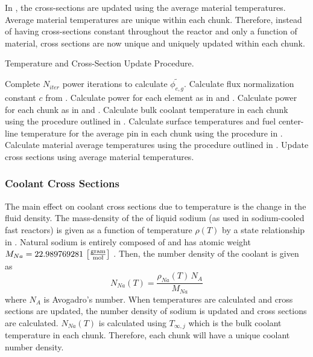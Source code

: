     In , the cross-sections are
    updated using the average material temperatures. Average material
    temperatures are unique within each chunk. Therefore, instead of having
    cross-sections constant throughout the reactor and only a function of
    material, cross sections are now unique and uniquely updated within each
    chunk.

    \begin{algorithm}
      \caption{Temperature and Cross-Section Update Procedure.}
      \label{algorithm:temperature_update}
      \begin{algorithmic}[1]
        \State Complete $N_{iter}$ power iterations to calculate
          $\widetilde{\phi_{e,g}}$.
        \State Calculate flux normalization constant $c$ from
          .
        \State Calculate power for each element as in  and
          .
        \State Calculate power for each chunk as in  and
          .
        \State Calculate bulk coolant temperature in each chunk using the 
          procedure outlined in .
        \State Calculate surface temperatures and fuel center-line temperature
          for the average pin in each chunk using the procedure in 
          .
        \State Calculate material average temperatures using the procedure 
          outlined in .
        \State Update cross sections using average material temperatures.
      \end{algorithmic}
    \end{algorithm}

    \subsubsection{Coolant Cross Sections}
      The main effect on coolant cross sections due to temperature is the change
      in the fluid density. The mass-density of the of liquid sodium (as used in
      sodium-cooled fast reactors) is given as a function of temperature
      $\rho(T)$ by a state relationship in \cite{sodiumProp}. Natural sodium is
      entirely composed of  and has atomic weight $M_{Na} =
      22.989769281 \,\left[\text{{$\frac{\text{gram}}{\text{mol}}$}}\right]$ \cite{nuclides}.
      Then, the number density of the coolant is given as
      \begin{equation}
        \label{eq:number_density_sodium}
        N_{Na}(T) = \frac{\rho_{Na}(T) \, N_A}{M_{Na}}
      \end{equation}
      where $N_A$ is Avogadro's number. When temperatures are calculated and
      cross sections are updated, the number density of sodium is updated and
      cross sections are calculated. $N_{Na}(T)$ is calculated using
      $T_{\infty,j}$ which is the bulk coolant temperature in each chunk.
      Therefore, each chunk will have a unique coolant number density.
      
